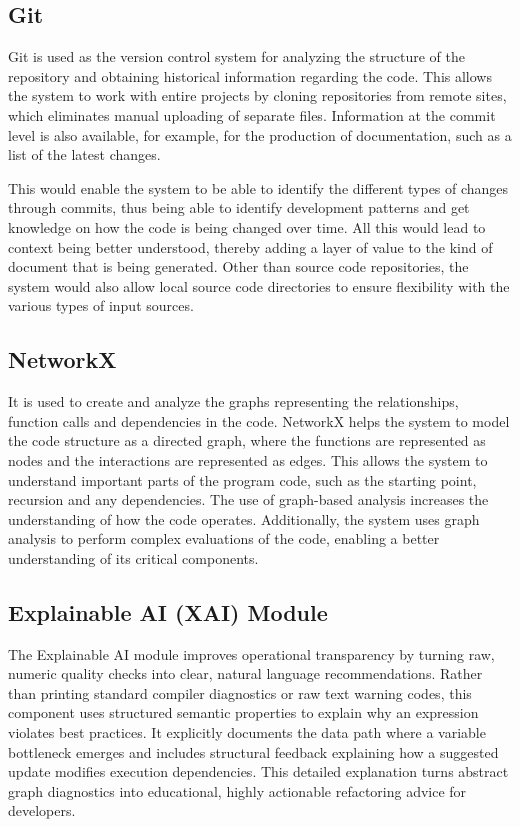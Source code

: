 \subsection{Git}
\hspace{0.5cm}
Git is used as the version control system for analyzing the structure of the repository and obtaining historical information regarding the code. This allows the system to work with entire projects by cloning repositories from remote sites, which eliminates manual uploading of separate files. Information at the commit level is also available, for example, for the production of documentation, such as a list of the latest changes. 

\par This would enable the system to be able to identify the different types of changes through commits, thus being able to identify development patterns and get knowledge on how the code is being changed over time. All this would lead to context being better understood, thereby adding a layer of value to the kind of document that is being generated. Other than source code repositories, the system would also allow local source code directories to ensure flexibility with the various types of input sources. 

\subsection{NetworkX}
\hspace{0.5cm}
It is used to create and analyze the graphs representing the relationships, function calls and dependencies in the code. NetworkX helps the system to model the code structure as a directed graph, where the functions are represented as nodes and the interactions are represented as edges. This allows the system to understand important parts of the program code, such as the starting point, recursion and any dependencies. The use of graph-based analysis increases the understanding of how the code operates. Additionally, the system uses graph analysis to perform complex evaluations of the code, enabling a better understanding of its critical components.

\subsection{Explainable AI (XAI) Module}
\hspace{0.5cm}
The Explainable AI module improves operational transparency by turning raw, numeric quality checks into clear, natural language recommendations. Rather than printing standard compiler diagnostics or raw text warning codes, this component uses structured semantic properties to explain why an expression violates best practices. It explicitly documents the data path where a variable bottleneck emerges and includes structural feedback explaining how a suggested update modifies execution dependencies. This detailed explanation turns abstract graph diagnostics into educational, highly actionable refactoring advice for developers.

